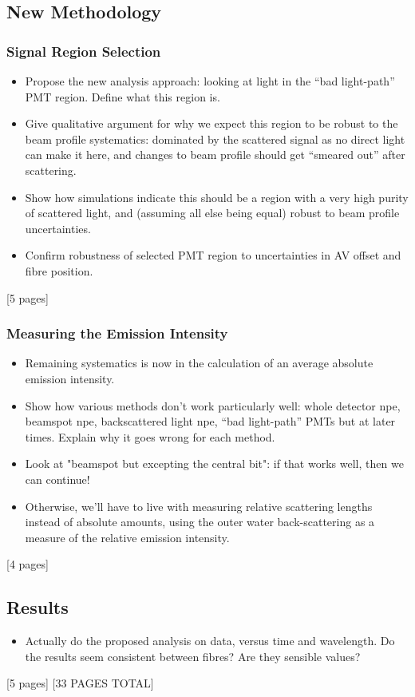 {\subsection{New Methodology}\label{sec:smellie_scatt_new_method}
\subsubsection{Signal Region Selection}
\begin{itemize}
    \item Propose the new analysis approach: looking at light in the ``bad light-path'' PMT region. Define what this region is.
    \item Give qualitative argument for why we expect this region to be robust to the beam profile systematics: dominated by the scattered signal as no direct light can make it here, and changes to beam profile should get ``smeared out'' after scattering.
    \item Show how simulations indicate this should be a region with a very high purity of scattered light, and (assuming all else being equal) robust to beam profile uncertainties.
    \item Confirm robustness of selected PMT region to uncertainties in AV offset and fibre position.
\end{itemize}
[5 pages]
\subsubsection{Measuring the Emission Intensity}\label{sec:smellie_intensity}
\begin{itemize}
    \item Remaining systematics is now in the calculation of an average absolute emission intensity.
    \item Show how various methods don't work particularly well: whole detector npe, beamspot npe, backscattered light npe, ``bad light-path'' PMTs but at later times. Explain why it goes wrong for each method.
    \item Look at "beamspot but excepting the central bit": if that works well, then we can continue!
    \item Otherwise, we'll have to live with measuring relative scattering lengths instead of absolute amounts, using the outer water back-scattering as a measure of the relative emission intensity.
\end{itemize}
[4 pages]
\subsection{Results}
\begin{itemize}
    \item Actually do the proposed analysis on data, versus time and wavelength. Do the results seem consistent between fibres? Are they sensible values?
\end{itemize}
[5 pages]
[33 PAGES TOTAL]
}